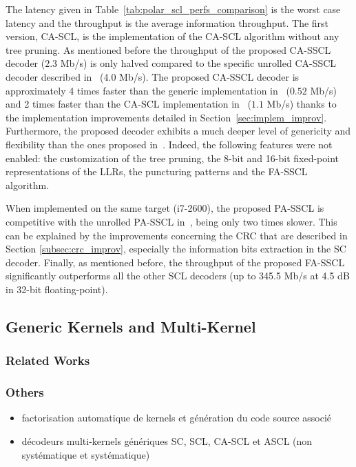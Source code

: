 The latency given in Table~\ref{tab:polar_scl_perfs_comparison} is the worst
case latency and the throughput is the average information throughput. The first
version, CA-SCL, is the implementation of the CA-SCL algorithm without any tree
pruning. As mentioned before the throughput of the proposed CA-SSCL decoder
($2.3$ Mb/s) is only halved compared to the specific unrolled CA-SSCL decoder
described in~\cite{Sarkis2016} (4.0 Mb/s). The proposed CA-SSCL decoder is
approximately 4 times faster than the generic implementation
in~\cite{Sarkis2014b} ($0.52$ Mb/s) and 2 times faster than the CA-SCL
implementation in~\cite{Shen2016} ($1.1$ Mb/s) thanks to the implementation
improvements detailed in Section~\ref{sec:implem_improv}.
Furthermore, the proposed decoder exhibits a much deeper level of genericity and
flexibility than the ones proposed in~\cite{Sarkis2014,Shen2016}. Indeed, the
following features were not enabled: the customization of the tree pruning, the
8-bit and 16-bit fixed-point representations of the LLRs, the puncturing
patterns and the FA-SSCL algorithm.

When implemented on the same target (i7-2600), the proposed PA-SSCL is
competitive with the unrolled PA-SSCL in~\cite{Sarkis2016}, being only two times
slower. This can be explained by the improvements concerning the CRC that are
described in Section \ref{subsec:crc_improv}, especially the information bits
extraction in the SC decoder. Finally, as mentioned before, the throughput of
the proposed FA-SSCL significantly outperforms all the other SCL decoders (up to
345.5 Mb/s at 4.5 dB in 32-bit floating-point).

\subsection{Generic Kernels and Multi-Kernel}

\subsubsection{Related Works}

\subsubsection{Others}

\begin{itemize}
  \item factorisation automatique de kernels et génération du code source
    associé
  \item décodeurs multi-kernels génériques SC, SCL, CA-SCL et ASCL (non
    systématique et systématique)
\end{itemize}

